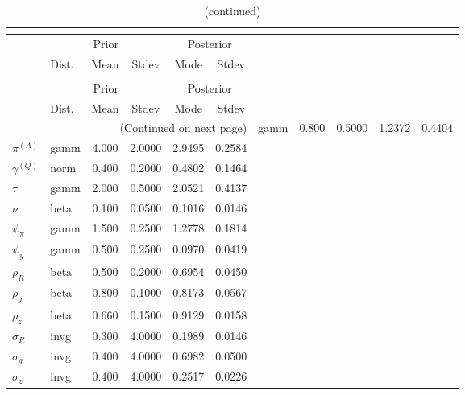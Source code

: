  
\begin{center}
\begin{longtable}{llcccc} 
\caption{Results from posterior maximization (parameters)}\\
 \label{Table:Posterior:1}\\
\toprule 
  & \multicolumn{3}{c}{Prior}  &  \multicolumn{2}{c}{Posterior} \\
  \cmidrule(r{.75em}){2-4} \cmidrule(r{.75em}){5-6}
  & Dist. & Mean  & Stdev & Mode & Stdev \\ 
\midrule \endfirsthead 
\caption{(continued)}\\
 \bottomrule 
  & \multicolumn{3}{c}{Prior}  &  \multicolumn{2}{c}{Posterior} \\
  \cmidrule(r{.75em}){2-4} \cmidrule(r{.75em}){5-6}
  & Dist. & Mean  & Stdev & Mode & Stdev \\ 
\midrule \endhead 
\bottomrule \multicolumn{6}{r}{(Continued on next page)}\endfoot 
\bottomrule\endlastfoot 
${r_{A}}$ & gamm &   0.800 & 0.5000 &   1.2372 &  0.4404 \\ 
${\pi^{(A)}}$ & gamm &   4.000 & 2.0000 &   2.9495 &  0.2584 \\ 
${\gamma^{(Q)}}$ & norm &   0.400 & 0.2000 &   0.4802 &  0.1464 \\ 
${\tau}$ & gamm &   2.000 & 0.5000 &   2.0521 &  0.4137 \\ 
${\nu}$ & beta &   0.100 & 0.0500 &   0.1016 &  0.0146 \\ 
${\psi_\pi}$ & gamm &   1.500 & 0.2500 &   1.2778 &  0.1814 \\ 
${\psi_y}$ & gamm &   0.500 & 0.2500 &   0.0970 &  0.0419 \\ 
${\rho_R}$ & beta &   0.500 & 0.2000 &   0.6954 &  0.0450 \\ 
${\rho_{g}}$ & beta &   0.800 & 0.1000 &   0.8173 &  0.0567 \\ 
${\rho_z}$ & beta &   0.660 & 0.1500 &   0.9129 &  0.0158 \\ 
${\sigma_R}$ & invg &   0.300 & 4.0000 &   0.1989 &  0.0146 \\ 
${\sigma_{g}}$ & invg &   0.400 & 4.0000 &   0.6982 &  0.0500 \\ 
${\sigma_z}$ & invg &   0.400 & 4.0000 &   0.2517 &  0.0226 \\ 
\end{longtable}
 \end{center}
